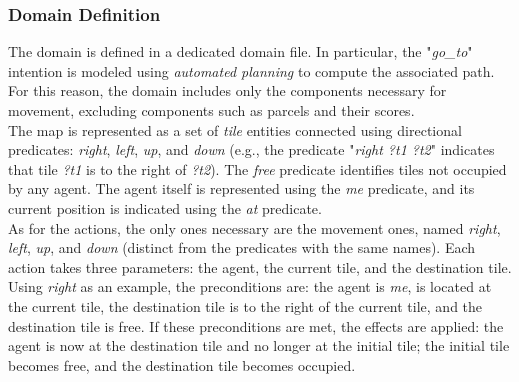         \subsubsection{Domain Definition}
            The domain is defined in a dedicated domain file. In particular, the "\textit{go\_to}" intention is modeled using \textit{automated planning} to compute the associated path. For this reason, the domain includes only the components necessary for movement, excluding components such as parcels and their scores.
            \medskip\\
            The map is represented as a set of \textit{tile} entities connected using directional predicates: \textit{right}, \textit{left}, \textit{up}, and \textit{down} (e.g., the predicate "\textit{right ?t1 ?t2}" indicates that tile \textit{?t1} is to the right of \textit{?t2}). The \textit{free} predicate identifies tiles not occupied by any agent. The agent itself is represented using the \textit{me} predicate, and its current position is indicated using the \textit{at} predicate.
            \medskip\\
            As for the actions, the only ones necessary are the movement ones, named \textit{right}, \textit{left}, \textit{up}, and \textit{down} (distinct from the predicates with the same names). Each action takes three parameters: the agent, the current tile, and the destination tile. Using \textit{right} as an example, the preconditions are: the agent is \textit{me}, is located at the current tile, the destination tile is to the right of the current tile, and the destination tile is free. If these preconditions are met, the effects are applied: the agent is now at the destination tile and no longer at the initial tile; the initial tile becomes free, and the destination tile becomes occupied.

